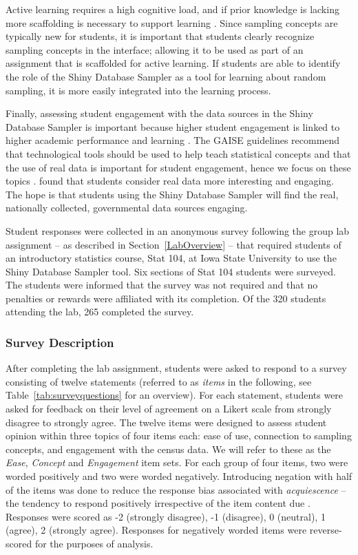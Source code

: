 \documentclass[11pt]{isuthesis}\usepackage[]{graphicx}\usepackage[]{color}
\begin{document}
Active learning requires a high cognitive load, and if prior knowledge is lacking more scaffolding is necessary to support learning \citep{muller2008}. Since sampling concepts are typically new for students, it is important that students clearly recognize sampling concepts in the interface; allowing it to be used as part of an assignment that is scaffolded for active learning. If students are able to identify the role of the Shiny Database Sampler as a tool for learning about random sampling, it is more easily integrated into the learning process.

Finally, assessing student engagement with the data sources in the Shiny Database Sampler is important because higher student engagement is linked to higher academic performance and learning \citep{carini2006student}. The GAISE guidelines recommend that technological tools should be used to help teach statistical concepts and that the use of real data is important for student engagement, hence we focus on these topics \citep{GAISEcollege}. \citet{Neumann2013} found that students consider real data more interesting and engaging. The hope is that students using the Shiny Database Sampler will find the real, nationally collected, governmental data sources engaging.

Student responses were collected in an anonymous survey following the group lab assignment -- as described in Section~\ref{LabOverview} -- that required students of an introductory statistics course, Stat 104, at Iowa State University to use the Shiny Database Sampler tool. Six sections of Stat 104 students were surveyed. The students were informed that the survey was not required and that no penalties or rewards were affiliated with its completion. Of the 320 students attending the lab, 265 completed the survey. 

 \subsubsection{Survey Description} 

After completing the lab assignment, students were asked to respond to a survey consisting of twelve statements (referred to as \textit{items} in the following, see Table~\ref{tab:surveyquestions} for an overview). For each statement, students were asked for feedback on their level of agreement on a Likert scale from strongly disagree to strongly agree. 
The twelve items were designed to assess student opinion within three topics of four items each: ease of use, connection to sampling concepts, and engagement with the census data.  We will refer to these as the \textit{Ease}, \textit{Concept} and \textit{Engagement} item sets.  For each group of four items, two were worded positively and two were worded negatively. Introducing negation with half of the items was done to reduce the response bias associated with \textit{acquiescence} -- the tendency to respond positively irrespective of the item content due \citep{Furnham1986}. Responses were scored as -2 (strongly disagree), -1 (disagree), 0 (neutral), 1 (agree), 2 (strongly agree).  Responses for negatively worded items were reverse-scored for the purposes of analysis.
\end{document}
